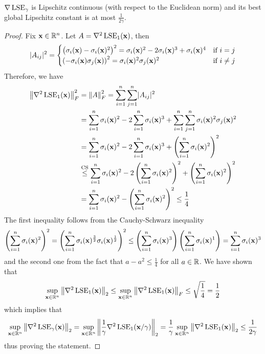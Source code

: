 \begin{theorem} \label{thm:LSE_Lipschitz_constant_upper_bound}
 \(\nabla \operatorname{LSE}_\gamma\) is Lipschitz continuous (with respect to the Euclidean norm) and its best global Lipschitz constant is at most \(\frac{1}{2\gamma}\).
\end{theorem}

\begin{proof}
 Fix \(\mathbf{x} \in \mathbb{R}^n\). Let \(A = \nabla^2 \operatorname{LSE}_1(\mathbf{x})\), then
 \[ \lvert A_{ij}\rvert^2 = \begin{cases}
                      \left({ \sigma_i(\mathbf{x}) - \sigma_i(\mathbf{x})^2 }\right)^2 = \sigma_i(\mathbf{x})^2 - 2 \sigma_i(\mathbf{x})^3 + \sigma_i(\mathbf{x})^4 & \text{if } i = j \\
                      \left({ - \sigma_i(\mathbf{x}) \sigma_j(\mathbf{x}) }\right)^2 = \sigma_i(\mathbf{x})^2 \sigma_j(\mathbf{x})^2                           & \text{if } i \neq j
                     \end{cases}
 \]
 Therefore, we have
 \begin{align*}
  \left\lVert \nabla^2 \operatorname{LSE}_1(\mathbf{x}) \right\rVert_F^2 & = \left\lVert A\right\rVert_F^2 = \sum_{i=1}^n \sum_{j=1}^n \lvert A_{ij}\rvert^2 \\
                                             & = \sum_{i=1}^n \sigma_i(\mathbf{x})^2 - 2 \sum_{i=1}^n \sigma_i(\mathbf{x})^3 + \sum_{i=1}^n \sum_{j=1}^n \sigma_i(\mathbf{x})^2 \sigma_j(\mathbf{x})^2 \\
                                             & = \sum_{i=1}^n \sigma_i(\mathbf{x})^2 - 2 \sum_{i=1}^n \sigma_i(\mathbf{x})^3 + \left({ \sum_{i=1}^n \sigma_i(\mathbf{x})^2 }\right)^2 \\
                                             & \stackrel{\text{CS}}{\leq} \sum_{i=1}^n \sigma_i(\mathbf{x})^2 - 2 \left({ \sum_{i=1}^n \sigma_i(\mathbf{x})^2 }\right)^2 + \left({ \sum_{i=1}^n \sigma_i(\mathbf{x})^2 }\right)^2 \\
                                             & = \sum_{i=1}^n \sigma_i(\mathbf{x})^2 - \left({ \sum_{i=1}^n \sigma_i(\mathbf{x})^2 }\right)^2 \leq \frac{1}{4}
 \end{align*}
 The first inequality follows from the Cauchy-Schwarz inequality
 \[ \left({ \sum_{i=1}^n \sigma_i(\mathbf{x})^2 }\right)^2 = \left({\sum_{i=1}^n \sigma_i(\mathbf{x})^{\frac{3}{2}} \sigma_i(\mathbf{x})^{\frac{1}{2}}}\right)^2 \leq \left({ \sum_{i=1}^n \sigma_i(\mathbf{x})^3 }\right) \left({ \sum_{i=1}^n \sigma_i(\mathbf{x})^1 }\right) = \sum_{i=1}^n \sigma_i(\mathbf{x})^3 \]
 and the second one from the fact that \(a - a^2 \leq \frac{1}{4}\) for all \(a \in \mathbb{R}\).
 We have shown that
 \[ \sup_{\mathbf{x} \in \mathbb{R}^n} \left\lVert \nabla^2 \operatorname{LSE}_1(\mathbf{x}) \right\rVert_2 \leq \sup_{\mathbf{x} \in \mathbb{R}^n} \left\lVert \nabla^2 \operatorname{LSE}_1(\mathbf{x}) \right\rVert_F \leq \sqrt{\frac{1}{4}} = \frac{1}{2}\] 
 which implies that
 \[ \sup_{\mathbf{x} \in \mathbb{R}^n} \left\lVert \nabla^2 \operatorname{LSE}_\gamma(\mathbf{x}) \right\rVert_2 = \sup_{\mathbf{x} \in \mathbb{R}^n} \left\lVert \frac{1}{\gamma} \nabla^2 \operatorname{LSE}_1(\mathbf{x}/\gamma) \right\rVert_2 = \frac{1}{\gamma}  \sup_{\mathbf{x} \in \mathbb{R}^n} \left\lVert \nabla^2 \operatorname{LSE}_1(\mathbf{x}) \right\rVert_2 \leq \frac{1}{2 \gamma} \]
 thus proving the statement.
\end{proof}


